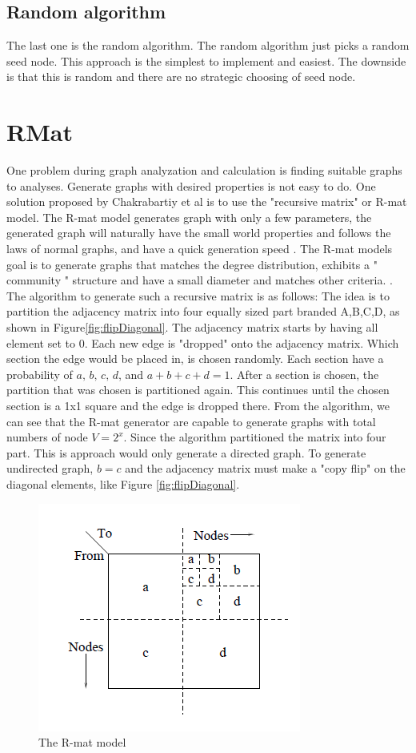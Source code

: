 \subsection{Random algorithm}
The last one is the random algorithm. The random algorithm just picks a random seed node. This approach is the simplest to implement and easiest. The downside is that this is random and there are no strategic choosing of seed node. 

\section{RMat}
One problem during graph analyzation and calculation is finding suitable graphs to analyses. Generate graphs with desired properties is not easy to do. One solution proposed by Chakrabartiy et al is to use the "recursive matrix" or R-mat model. The R-mat model generates graph with only a few parameters, the generated graph will naturally have the small world properties and follows the laws of normal graphs, and have a quick generation speed \cite{Rmat2004}. The R-mat models goal is to generate graphs that matches the degree distribution, exhibits a " community " structure and have a small diameter and matches other criteria. \cite{Rmat2004}. The algorithm to generate such a recursive matrix is as follows: The idea is to partition the adjacency matrix into four equally sized part branded A,B,C,D, as shown in Figure\ref{fig:flipDiagonal}. The adjacency matrix starts by having all element set to 0. Each new edge is "dropped" onto the adjacency matrix. Which section the edge would be placed in, is chosen randomly. Each section have a probability of $\textit{a, b, c, d}$, and $a + b + c + d = 1$. After a section is chosen, the partition that was chosen is partitioned again. This continues until the chosen section is a 1x1 square and the edge is dropped there. From the algorithm, we can see that the R-mat generator are capable to generate graphs with total numbers of node $ \textit{V} = 2^x$. Since the algorithm partitioned the matrix into four part. This is approach would only generate a directed graph. To generate undirected graph, $b = c$ and the adjacency matrix must make a "copy flip" on the diagonal elements, like Figure \ref{fig:flipDiagonal}. 


\begin{figure}
\includegraphics{Figures/Rmat}
\caption{The R-mat model \cite{Rmat2004}}
\label{fig:Rmat}
\end{figure}


